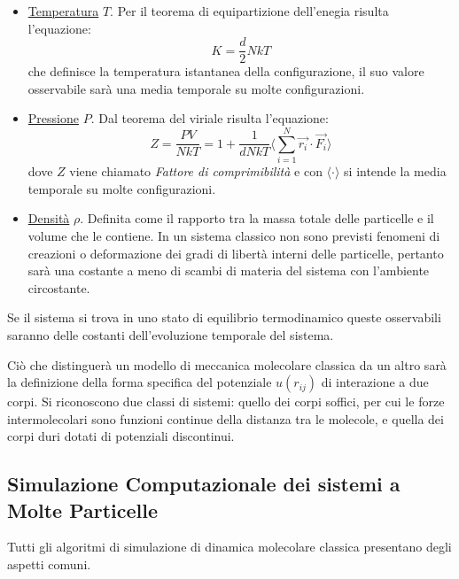 \documentclass[11pt]{article}
\theoremstyle{plain}
\theoremstyle{remark}
\begin{document}
\begin{itemize}
\item \underline{Temperatura} $T$. Per il teorema di equipartizione dell'enegia risulta l'equazione:
\begin{equation}\label{eq: temperatura}
K = \dfrac{d}{2}N k T
\end{equation}
che definisce la temperatura istantanea della configurazione, il suo valore osservabile sarà una media temporale su molte configurazioni.

\item \underline{Pressione} $P$. Dal teorema del viriale risulta l'equazione:
\begin{equation}\label{eq: Pressione}
Z = \dfrac{P V}{N kT} = 1 + \dfrac{1}{d N kT} \Biggr\langle \sum_{i=1}^N \vec{r_i}\cdot\vec{F_i}\Biggr\rangle
\end{equation}
dove $Z$ viene chiamato \emph{Fattore di comprimibilità} e con $\langle \cdot \rangle$ si intende la media temporale su molte configurazioni.

\item \underline{Densità} $\rho$. Definita come il rapporto tra la massa totale delle particelle e il volume che le contiene. In un sistema classico non sono previsti fenomeni di creazioni o deformazione dei gradi di libertà interni delle particelle, pertanto sarà una costante a meno di scambi di materia del sistema con l'ambiente circostante.
\end{itemize}
Se il sistema si trova in uno stato di equilibrio termodinamico queste osservabili saranno delle costanti dell'evoluzione temporale del sistema.

\medskip
Ciò che distinguerà un modello di meccanica molecolare classica da un altro sarà la definizione della forma specifica del potenziale $u(r_{ij})$ di interazione a due corpi. Si riconoscono due classi di sistemi: quello dei corpi soffici, per cui le forze intermolecolari sono funzioni continue della distanza tra le molecole, e quella dei corpi duri dotati di potenziali discontinui.





\FloatBarrier
\subsection{Simulazione Computazionale dei sistemi a Molte Particelle}\label{cap: Simulazione in Generale}
Tutti gli algoritmi di simulazione di dinamica molecolare classica presentano degli aspetti comuni.
\end{document}
